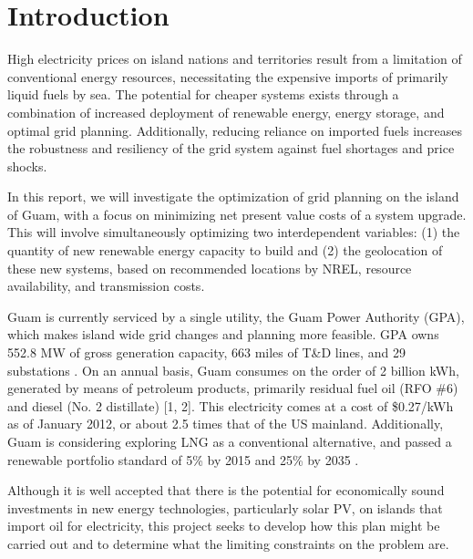 \documentclass[12pt,letterpaper,fleqn]{report}
\begin{document}



\section{Introduction}

High electricity prices on island nations and territories result from
a limitation of conventional energy resources, necessitating the
expensive imports of primarily liquid fuels by sea. The potential for
cheaper systems exists through a combination of increased deployment
of renewable energy, energy storage, and optimal grid
planning. Additionally, reducing reliance on imported fuels increases
the robustness and resiliency of the grid system against fuel
shortages and price shocks.

In this report, we will investigate the optimization of grid planning
on the island of Guam, with a focus on minimizing net present value
costs of a system upgrade. This will involve simultaneously optimizing
two interdependent variables: (1) the quantity of new renewable energy
capacity to build and (2) the geolocation of these new systems, based
on recommended locations by NREL, resource availability, and
transmission costs.

Guam is currently serviced by a single utility, the Guam Power
Authority (GPA), which makes island wide grid changes and planning
more feasible. GPA owns 552.8 MW of gross generation capacity, 663
miles of T\&D lines, and 29 substations \cite{gpa14a}. On an
annual basis, Guam consumes on the order of 2 billion kWh, generated
by means of petroleum products, primarily residual fuel oil (RFO \#6)
and diesel (No. 2 distillate) [1, 2]. This electricity comes at a cost
of \$0.27/kWh as of January 2012, or about 2.5 times that of the US
mainland. Additionally, Guam is considering exploring LNG as a
conventional alternative, and passed a renewable portfolio standard of
5\% by 2015 and 25\% by 2035 \cite{eia12}.

Although it is well accepted that there is the potential for
economically sound investments in new energy technologies,
particularly solar PV, on islands that import oil for electricity,
this project seeks to develop how this plan might be carried out and
to determine what the limiting constraints on the problem are.
\end{document}
